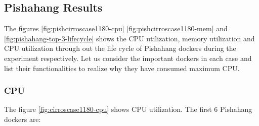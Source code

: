 \subsection{Pishahang Results}
The figures \ref{fig:pishcirroscase1180-cpu} \ref{fig:pishcirroscase1180-mem} and \ref{fig:pishahang-top-3-lifecycle} shows the CPU utilization, memory utilization and CPU utilization through out the life cycle of Pishahang dockers during the experiment respectively. Let us consider the important dockers in each case and list their functionalities to realize why they have consumed maximum CPU.


\subsubsection{CPU}

The figure \ref{fig:cirroscase1180-cpu} shows CPU utilization. The first 6 Pishahang dockers are:

